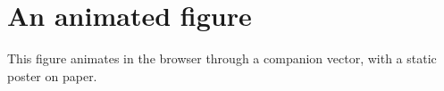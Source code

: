 \documentclass{article}
\begin{document}
\section{An animated figure}
This figure animates in the browser through a companion vector, with a
static poster on paper.

\begin{center}
\end{center}
\end{document}
